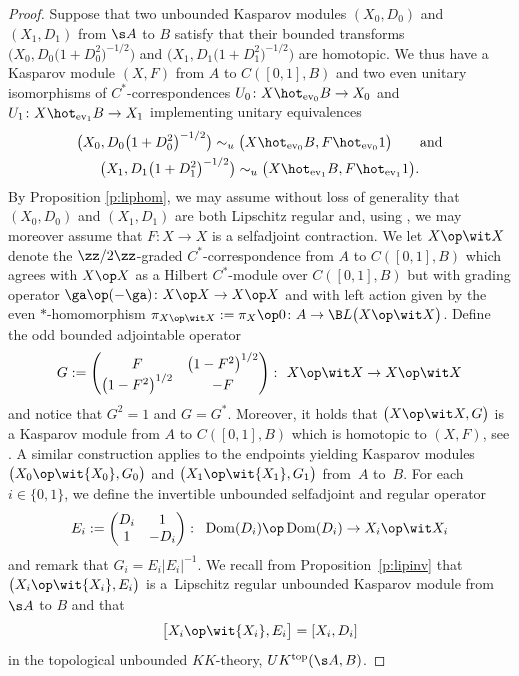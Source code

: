 \begin{proof}
Suppose that two unbounded Kasparov modules $(X_0,D_0)$ and $(X_1,D_1)$ from $\s A$ to $B$ satisfy that their bounded transforms $\big(X_0, D_0\big(1 + D_0^2\big)^{-1/2}\big)$ and $\big(X_1,D_1\big(1 + D_1^2\big)^{-1/2}\big)$ are homotopic. We thus have a Kasparov module $(X,F)$ from $A$ to $C([0,1],B)$ and two even unitary isomorphisms of $C^*$-correspondences $U_0\colon X \hot_{{\rm ev}_0} B \to X_0$ and $U_1\colon X \hot_{{\rm ev}_1} B \to X_1$ implementing unitary equivalences
\begin{gather*}
 \big(X_0, D_0 \big(1 + D_0^2\big)^{-1/2}\big) \sim_u \big(X \hot_{{\rm ev}_0} B, F \hot_{{\rm ev}_0} 1\big) \qquad \text{and} \\
 \big(X_1, D_1 \big(1 + D_1^2\big)^{-1/2}\big) \sim_u \big(X \hot_{{\rm ev}_1} B, F \hot_{{\rm ev}_1} 1\big) .
\end{gather*}
By Proposition \ref{p:liphom}, we may assume without loss of generality that $(X_0,D_0)$ and $(X_1,D_1)$ are both Lipschitz regular and, using \cite[Proposition~17.4.3]{Bla:KOA}, we may moreover assume that \mbox{$F\colon X \to X$} is a selfadjoint contraction. We let $X \op \wit X$ denote the $\zz/2\zz$-graded $C^*$-cor\-respon\-dence from $A$ to $C( [0,1],B)$ which agrees with $X \op X$ as a Hilbert $C^*$-module over $C([0,1],B)$ but with grading operator $\ga \op (-\ga)\colon X \op X \to X \op X$ and with left action given by the even $*$-homomorphism $\pi_{X \op \wit X} := \pi_X \op 0\colon A \to \B L\big(X \op \wit X\big)$. Define the odd bounded adjointable operator
\[
G := \left(\begin{matrix} F & \big(1 - F^2\big)^{1/2} \\ \big(1 - F^2\big)^{1/2} & - F\end{matrix}\right) \colon \ X \op \wit X \to X \op \wit X
\]
and notice that $G^2 = 1$ and $G = G^*$. Moreover, it holds that $\big(X \op \wit X, G\big)$ is a Kasparov module from $A$ to $C( [0,1],B)$ which is homotopic to $(X,F)$, see \cite[Section~17.6]{Bla:KOA}. A similar construction applies to the endpoints yielding Kasparov modules $\big(X_0 \op \wit{X_0}, G_0\big)$ and $\big(X_1 \op \wit{X_1}, G_1\big)$ from~$A$ to~$B$. For each $i \in \{0,1\}$, we define the invertible unbounded selfadjoint and regular operator
\[
E_i := \left(\begin{matrix} D_i & 1 \\ 1 & - D_i\end{matrix}\right) \colon \ \operatorname{Dom}(D_i) \op \operatorname{Dom}(D_i) \to X_i \op \wit X_i
\]
and remark that $G_i = E_i |E_i|^{-1}$. We recall from Proposition~\ref{p:lipinv} that $\big(X_i \op \wit{X_i}, E_i\big)$ is a~Lipschitz regular unbounded Kasparov module from $\s A$ to $B$ and that{\samepage
\[
\big[ X_i \op \wit{X_i}, E_i\big] = [X_i , D_i]
\]
in the topological unbounded $KK$-theory, $UK^{{\rm top}}(\s A,B)$.}


\end{proof}
